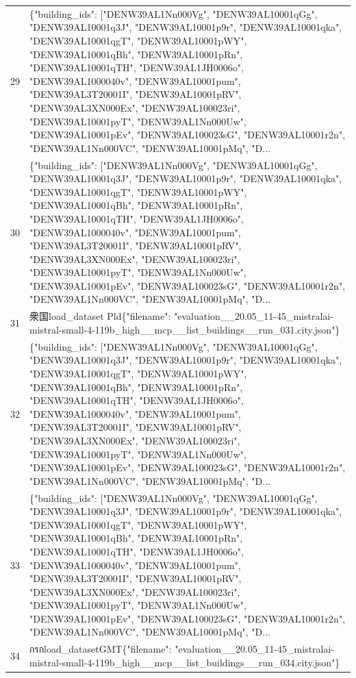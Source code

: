 \documentclass[a4paper,11pt]{article}
\begin{document}
\begin{table}[ht]
\begin{tabular}{r p{12cm}}
29 & \{"building\_ids": ["DENW39AL1Nn000Vg", "DENW39AL10001qGg", "DENW39AL10001q3J", "DENW39AL10001p9r", "DENW39AL10001qka", "DENW39AL10001qgT", "DENW39AL10001pWY", "DENW39AL10001qBh", "DENW39AL10001pRn", "DENW39AL10001qTH", "DENW39AL1JH0006o", "DENW39AL1000040v", "DENW39AL10001pum", "DENW39AL3T20001I", "DENW39AL10001pRV", "DENW39AL3XN000Ex", "DENW39AL100023ri", "DENW39AL10001pyT", "DENW39AL1Nn000Uw", "DENW39AL10001pEv", "DENW39AL100023sG", "DENW39AL10001r2n", "DENW39AL1Nn000VC", "DENW39AL10001pMq", "D... \\
30 & \{"building\_ids": ["DENW39AL1Nn000Vg", "DENW39AL10001qGg", "DENW39AL10001q3J", "DENW39AL10001p9r", "DENW39AL10001qka", "DENW39AL10001qgT", "DENW39AL10001pWY", "DENW39AL10001qBh", "DENW39AL10001pRn", "DENW39AL10001qTH", "DENW39AL1JH0006o", "DENW39AL1000040v", "DENW39AL10001pum", "DENW39AL3T20001I", "DENW39AL10001pRV", "DENW39AL3XN000Ex", "DENW39AL100023ri", "DENW39AL10001pyT", "DENW39AL1Nn000Uw", "DENW39AL10001pEv", "DENW39AL100023sG", "DENW39AL10001r2n", "DENW39AL1Nn000VC", "DENW39AL10001pMq", "D... \\
31 & 衆国load\_dataset Pld\{"filename": "evaluation\_\_20.05\_11-45\_mistralai-mistral-small-4-119b\_high\_\_mcp\_\_list\_buildings\_\_run\_031.city.json"\} \\
32 & \{"building\_ids": ["DENW39AL1Nn000Vg", "DENW39AL10001qGg", "DENW39AL10001q3J", "DENW39AL10001p9r", "DENW39AL10001qka", "DENW39AL10001qgT", "DENW39AL10001pWY", "DENW39AL10001qBh", "DENW39AL10001pRn", "DENW39AL10001qTH", "DENW39AL1JH0006o", "DENW39AL1000040v", "DENW39AL10001pum", "DENW39AL3T20001I", "DENW39AL10001pRV", "DENW39AL3XN000Ex", "DENW39AL100023ri", "DENW39AL10001pyT", "DENW39AL1Nn000Uw", "DENW39AL10001pEv", "DENW39AL100023sG", "DENW39AL10001r2n", "DENW39AL1Nn000VC", "DENW39AL10001pMq", "D... \\
33 & \{"building\_ids": ["DENW39AL1Nn000Vg", "DENW39AL10001qGg", "DENW39AL10001q3J", "DENW39AL10001p9r", "DENW39AL10001qka", "DENW39AL10001qgT", "DENW39AL10001pWY", "DENW39AL10001qBh", "DENW39AL10001pRn", "DENW39AL10001qTH", "DENW39AL1JH0006o", "DENW39AL1000040v", "DENW39AL10001pum", "DENW39AL3T20001I", "DENW39AL10001pRV", "DENW39AL3XN000Ex", "DENW39AL100023ri", "DENW39AL10001pyT", "DENW39AL1Nn000Uw", "DENW39AL10001pEv", "DENW39AL100023sG", "DENW39AL10001r2n", "DENW39AL1Nn000VC", "DENW39AL10001pMq", "D... \\
34 &  กรกload\_datasetGMT\{"filename": "evaluation\_\_20.05\_11-45\_mistralai-mistral-small-4-119b\_high\_\_mcp\_\_list\_buildings\_\_run\_034.city.json"\} \\

\end{tabular}
\end{table}
\end{document}
